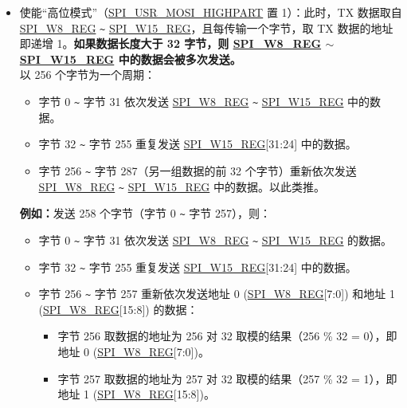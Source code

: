 \documentclass[main\_\_CN.tex]{subfiles}
\begin{document}
\begin{itemize}
\begin{itemize}
\begin{itemize}
\begin{itemize}
                    \item 字节 257 取数据的地址为 257 对 64 取模的结果（257 \% 64 = 1），即地址 1 (\hyperref[regdesc:SPIW0REG]{SPI\_W0\_REG}[15:8])。
                \end{itemize}
        \end{itemize}
        \item 使能“高位模式”（\hyperref[fielddesc:SPIUSRMOSIHIGHPART]{SPI\_USR\_MOSI\_HIGHPART} 置 1）：此时，TX 数据取自 \hyperref[regdesc:SPIW0REG]{SPI\_W8\_REG} \verb+~+ \hyperref[regdesc:SPIW0REG]{SPI\_W15\_REG}，且每传输一个字节，取 TX 数据的地址即递增 1。\textbf{如果数据长度大于 32 字节，则 \hyperref[regdesc:SPIW0REG]{SPI\_W8\_REG} $\sim$ \hyperref[regdesc:SPIW0REG]{SPI\_W15\_REG} 中的数据会被多次发送。}\\
        以 256 个字节为一个周期：
        \begin{itemize}
            \item 字节 0 \verb+~+ 字节 31 依次发送 \hyperref[regdesc:SPIW0REG]{SPI\_W8\_REG} \verb+~+ \hyperref[regdesc:SPIW0REG]{SPI\_W15\_REG} 中的数据。
            \item 字节 32 \verb+~+ 字节 255 重复发送 \hyperref[regdesc:SPIW0REG]{SPI\_W15\_REG}[31:24] 中的数据。
            \item 字节 256 \verb+~+ 字节 287（另一组数据的前 32 个字节）重新依次发送 \hyperref[regdesc:SPIW0REG]{SPI\_W8\_REG} \verb+~+ \hyperref[regdesc:SPIW0REG]{SPI\_W15\_REG} 中的数据。以此类推。
        \end{itemize}
        \textbf{例如：}发送 258 个字节（字节 0 \verb+~+ 字节 257），则：
        \begin{itemize}
            \item 字节 0 \verb+~+ 字节 31 依次发送 \hyperref[regdesc:SPIW0REG]{SPI\_W8\_REG} \verb+~+ \hyperref[regdesc:SPIW0REG]{SPI\_W15\_REG} 的数据。
            \item 字节 32 \verb+~+ 字节 255 重复发送 \hyperref[regdesc:SPIW0REG]{SPI\_W15\_REG}[31:24] 中的数据。
            \item 字节 256 \verb+~+ 字节 257 重新依次发送地址 0 (\hyperref[regdesc:SPIW0REG]{SPI\_W8\_REG}[7:0]) 和地址 1 (\hyperref[regdesc:SPIW0REG]{SPI\_W8\_REG}[15:8]) 的数据：
                \begin{itemize}
                    \item 字节 256 取数据的地址为 256 对 32 取模的结果（256 \% 32 = 0），即地址 0 (\hyperref[regdesc:SPIW0REG]{SPI\_W8\_REG}[7:0])。
                    \item 字节 257 取数据的地址为 257 对 32 取模的结果（257 \% 32 = 1），即地址 1 (\hyperref[regdesc:SPIW0REG]{SPI\_W8\_REG}[15:8])。
                \end{itemize}
        \end{itemize}        
        

\end{itemize}
\end{itemize}
\end{document}
